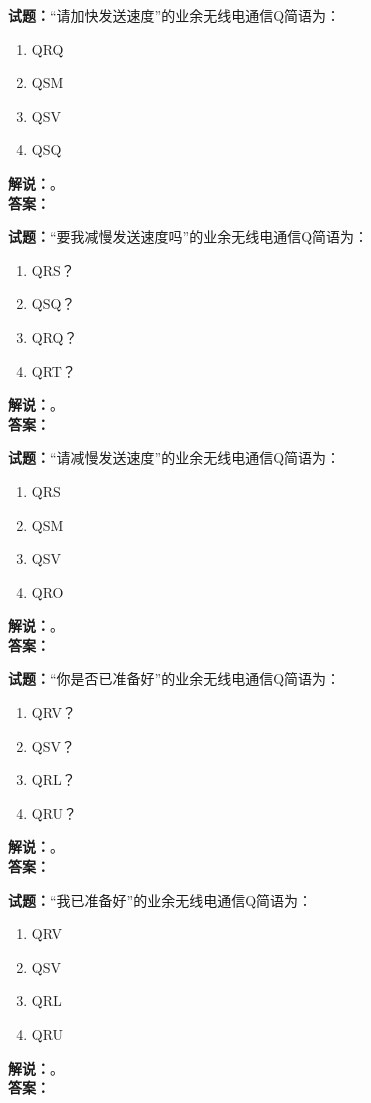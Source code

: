 \documentclass{ctexbook}
\begin{document}
\noindent\textbf{试题：}“请加快发送速度”的业余无线电通信Q简语为：
\begin{enumerate}[leftmargin=3em]
\item QRQ
\item QSM
\item QSV
\item QSQ
\end{enumerate}
\noindent\textbf{解说：}\textbf{}。\\\noindent\textbf{答案：}

\bigskip




\noindent\textbf{试题：}“要我减慢发送速度吗”的业余无线电通信Q简语为：
\begin{enumerate}[leftmargin=3em]
\item QRS？
\item QSQ？
\item QRQ？
\item QRT？
\end{enumerate}
\noindent\textbf{解说：}\textbf{}。\\\noindent\textbf{答案：}

\bigskip




\noindent\textbf{试题：}“请减慢发送速度”的业余无线电通信Q简语为：
\begin{enumerate}[leftmargin=3em]
\item QRS
\item QSM
\item QSV
\item QRO
\end{enumerate}
\noindent\textbf{解说：}\textbf{}。\\\noindent\textbf{答案：}

\bigskip




\noindent\textbf{试题：}“你是否已准备好”的业余无线电通信Q简语为：
\begin{enumerate}[leftmargin=3em]
\item QRV？
\item QSV？
\item QRL？
\item QRU？
\end{enumerate}
\noindent\textbf{解说：}\textbf{}。\\\noindent\textbf{答案：}

\bigskip




\noindent\textbf{试题：}“我已准备好”的业余无线电通信Q简语为：
\begin{enumerate}[leftmargin=3em]
\item QRV
\item QSV
\item QRL
\item QRU
\end{enumerate}
\noindent\textbf{解说：}\textbf{}。\\\noindent\textbf{答案：}
\end{document}
